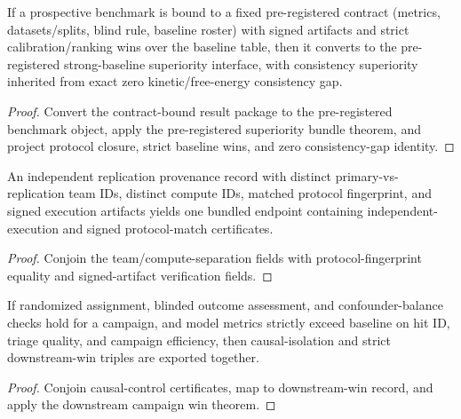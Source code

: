 \begin{theorem}\label{thm:fixed-contract-preregistered-benchmark-bundle}
If a prospective benchmark is bound to a fixed pre-registered contract (metrics, datasets/splits, blind rule, baseline roster) with signed artifacts and strict calibration/ranking wins over the baseline table, then it converts to the pre-registered strong-baseline superiority interface, with consistency superiority inherited from exact zero kinetic/free-energy consistency gap.
\end{theorem}

\begin{proof}
Convert the contract-bound result package to the pre-registered benchmark object, apply the pre-registered superiority bundle theorem, and project protocol closure, strict baseline wins, and zero consistency-gap identity.
\end{proof}

\begin{theorem}\label{thm:independent-replication-provenance-bundle}
An independent replication provenance record with distinct primary-vs-replication team IDs, distinct compute IDs, matched protocol fingerprint, and signed execution artifacts yields one bundled endpoint containing independent-execution and signed protocol-match certificates.
\end{theorem}

\begin{proof}
Conjoin the team/compute-separation fields with protocol-fingerprint equality and signed-artifact verification fields.
\end{proof}

\begin{theorem}\label{thm:downstream-causal-quality-bundle}
If randomized assignment, blinded outcome assessment, and confounder-balance checks hold for a campaign, and model metrics strictly exceed baseline on hit ID, triage quality, and campaign efficiency, then causal-isolation and strict downstream-win triples are exported together.
\end{theorem}

\begin{proof}
Conjoin causal-control certificates, map to downstream-win record, and apply the downstream campaign win theorem.
\end{proof}


